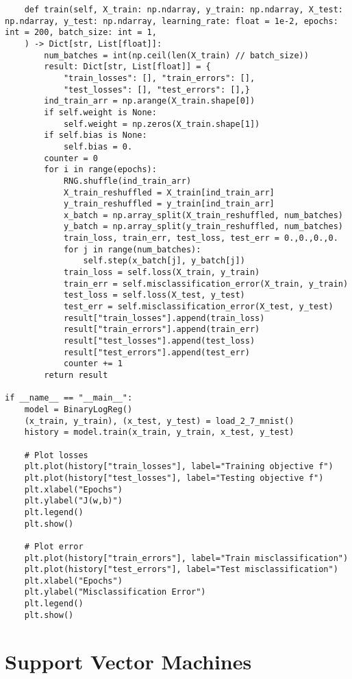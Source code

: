 \documentclass{article}
\begin{document}
\begin{lstlisting}
    def train(self, X_train: np.ndarray, y_train: np.ndarray, X_test: np.ndarray, y_test: np.ndarray, learning_rate: float = 1e-2, epochs: int = 200, batch_size: int = 1,
    ) -> Dict[str, List[float]]:
        num_batches = int(np.ceil(len(X_train) // batch_size))
        result: Dict[str, List[float]] = {
            "train_losses": [], "train_errors": [],
            "test_losses": [], "test_errors": [],}
        ind_train_arr = np.arange(X_train.shape[0])
        if self.weight is None:
            self.weight = np.zeros(X_train.shape[1])
        if self.bias is None:
            self.bias = 0.
        counter = 0
        for i in range(epochs):
            RNG.shuffle(ind_train_arr)
            X_train_reshuffled = X_train[ind_train_arr]
            y_train_reshuffled = y_train[ind_train_arr]
            x_batch = np.array_split(X_train_reshuffled, num_batches)
            y_batch = np.array_split(y_train_reshuffled, num_batches)
            train_loss, train_err, test_loss, test_err = 0.,0.,0.,0.
            for j in range(num_batches):
                self.step(x_batch[j], y_batch[j])
            train_loss = self.loss(X_train, y_train)
            train_err = self.misclassification_error(X_train, y_train)
            test_loss = self.loss(X_test, y_test)
            test_err = self.misclassification_error(X_test, y_test)
            result["train_losses"].append(train_loss)
            result["train_errors"].append(train_err)
            result["test_losses"].append(test_loss)
            result["test_errors"].append(test_err)
            counter += 1
        return result   

if __name__ == "__main__":
    model = BinaryLogReg()
    (x_train, y_train), (x_test, y_test) = load_2_7_mnist()
    history = model.train(x_train, y_train, x_test, y_test)

    # Plot losses
    plt.plot(history["train_losses"], label="Training objective f")
    plt.plot(history["test_losses"], label="Testing objective f")
    plt.xlabel("Epochs")
    plt.ylabel("J(w,b)")
    plt.legend()
    plt.show()

    # Plot error
    plt.plot(history["train_errors"], label="Train misclassification")
    plt.plot(history["test_errors"], label="Test misclassification")
    plt.xlabel("Epochs")
    plt.ylabel("Misclassification Error")
    plt.legend()
    plt.show()
    \end{lstlisting}

\section*{Support Vector Machines}
\end{document}

